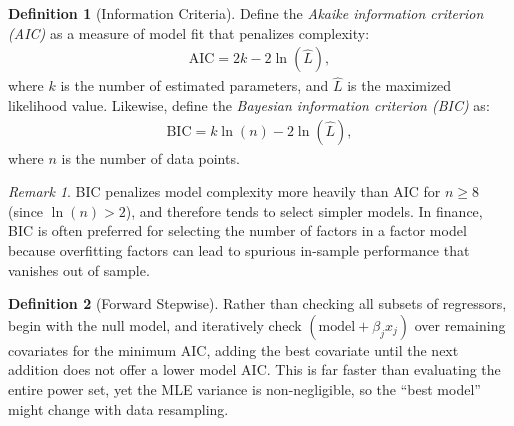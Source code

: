 \documentclass[11pt]{article}
\theoremstyle{definition}
\newtheorem{definition}{Definition}[section]
\theoremstyle{plain}
\theoremstyle{remark}
\newtheorem{remark}{Remark}[section]
\begin{document}
\begin{definition}[Information Criteria]
    Define the \textit{Akaike information criterion (AIC)} as a measure of model fit that penalizes complexity:
    \begin{align}
        \text{AIC} = 2k - 2\ln (\hat{L}),
    \end{align}
    where $k$ is the number of estimated parameters, and $\hat{L}$ is the maximized likelihood value. Likewise, define the \textit{Bayesian information criterion (BIC)} as:
    \begin{align}
        \text{BIC} = k \ln(n)- 2\ln (\hat{L}),
    \end{align}
    where $n$ is the number of data points.
\end{definition}

\begin{remark}
    BIC penalizes model complexity more heavily than AIC for $n \geq 8$ (since $\ln(n) > 2$), and therefore tends to select simpler models. In finance, BIC is often preferred for selecting the number of factors in a factor model because overfitting factors can lead to spurious in-sample performance that vanishes out of sample.
\end{remark}

\begin{definition}[Forward Stepwise]
    Rather than checking all subsets of regressors, begin with the null model, and iteratively check $(\text{model} + \beta_jx_j)$ over remaining covariates for the minimum AIC, adding the best covariate until the next addition does not offer a lower model AIC. This is far faster than evaluating the entire power set, yet the MLE variance is non-negligible, so the ``best model'' might change with data resampling.
\end{definition}
\end{document}
